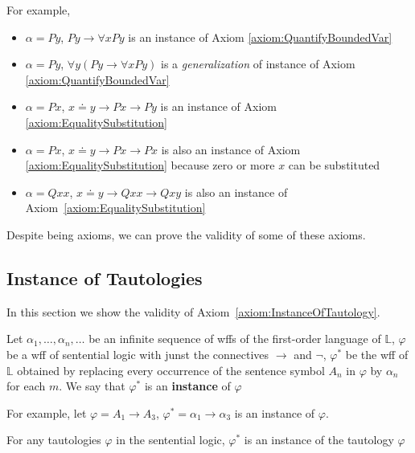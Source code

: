 For example,

\begin{itemize}
    \item $\alpha=Py$, $Py \to \forall x Py$ is an instance of Axiom \ref{axiom:QuantifyBoundedVar}
    \item $\alpha=Py$, $\forall y(Py\to \forall xPy)$ is a \emph{generalization} of instance of Axiom \ref{axiom:QuantifyBoundedVar}
    \item $\alpha = Px$, $x \doteq y \to Px\to Py$ is an instance of Axiom \ref{axiom:EqualitySubstitution}
    \item $\alpha = Px$, $x \doteq y \to Px \to Px$ is also an instance of Axiom \ref{axiom:EqualitySubstitution} because zero or more $x$ can be substituted
    \item $\alpha = Qxx$, $x\doteq y \to Qxx \to Qxy$ is also an instance of Axiom~\ref{axiom:EqualitySubstitution}
\end{itemize}

Despite being axioms, we can prove the validity of some of these axioms.

\subsection{Instance of Tautologies}

In this section we show the validity of Axiom~\ref{axiom:InstanceOfTautology}.

\begin{definition}
    Let $\alpha_1,\dots,\alpha_n,\dots$ be an infinite sequence of wffs of the first-order language of $\mathbb{L}$, $\varphi$ be a wff of sentential logic with junst the connectives $\to$ and $\neg$, $\varphi^\ast$ be the wff of $\mathbb{L}$ obtained by replacing every occurrence of the sentence symbol $A_n$ in $\varphi$ by $\alpha_n$ for each $m$. We say that $\varphi^\ast$ is an \textbf{instance} of $\varphi$
\end{definition}

For example, let $\varphi=A_1\to A_3$, $\varphi^\ast = \alpha_1 \to \alpha_3$ is an instance of $\varphi$.

\begin{definition}
    For any tautologies $\varphi$ in the sentential logic, $\varphi^\ast$ is an instance of the tautology $\varphi$
\end{definition}

